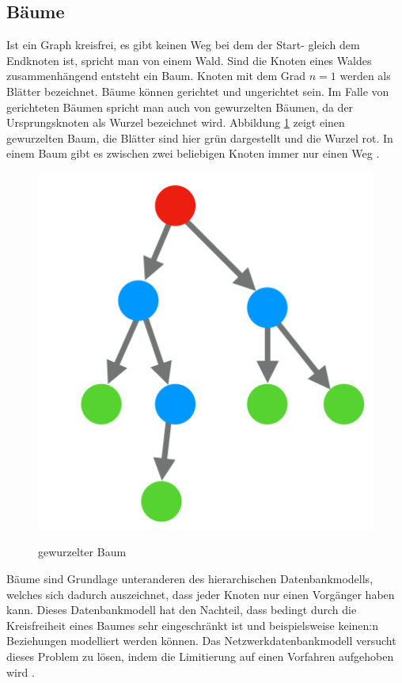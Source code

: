 \subsection{Bäume}
Ist ein Graph kreisfrei, es gibt keinen Weg bei dem der Start- gleich dem Endknoten ist, spricht man von einem Wald.
Sind die Knoten eines Waldes zusammenhängend entsteht ein Baum.
Knoten mit dem Grad $n=1$ werden als Blätter bezeichnet.
Bäume können gerichtet und ungerichtet sein.
Im Falle von gerichteten Bäumen spricht man auch von gewurzelten Bäumen, da der Ursprungsknoten als Wurzel bezeichnet wird.
Abbildung \ref{2.baum.image} zeigt einen gewurzelten Baum, die Blätter sind hier grün dargestellt und die Wurzel rot.
In einem Baum gibt es zwischen zwei beliebigen Knoten immer nur einen Weg \cite{basicgraphtheory}.
\begin{figure}[H]
	\begin{center}
	\includegraphics[scale = 0.3]{./images/baum.png}
	\label{2.baum.image}
    \caption{gewurzelter Baum}
	\end{center}
\end{figure}
Bäume sind Grundlage unteranderen des hierarchischen Datenbankmodells, welches sich dadurch auszeichnet, dass jeder Knoten nur einen Vorgänger haben kann.
Dieses Datenbankmodell hat den Nachteil, dass bedingt durch die Kreisfreiheit eines Baumes sehr eingeschränkt ist und beispielsweise keinen:n Beziehungen modelliert werden können.
Das Netzwerkdatenbankmodell versucht dieses Problem zu lösen, indem die Limitierung auf einen Vorfahren aufgehoben wird \cite{hald2013datenbank}.
